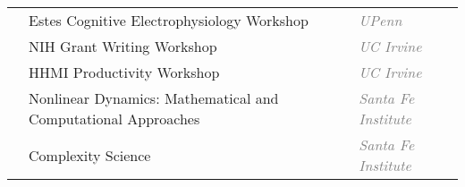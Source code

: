 \documentclass[11pt]{cooperCV_v1/cooperCV} %
\begin{document}



%


\selectfont


\begin{minipage}{\textwidth}







\begin{tabular}{ @{} p{} p{} p{} @{} }
  
  \small & {\small Estes Cognitive Electrophysiology Workshop} & \hfill {\small \textcolor{gray}{{\emph{UPenn}}}} \\
  
  \small & {\small NIH Grant Writing Workshop} & \hfill {\small \textcolor{gray}{{\emph{UC Irvine}}}} \\
  
  \small & {\small HHMI Productivity Workshop} & \hfill {\small \textcolor{gray}{{\emph{UC Irvine}}}} \\
  
  \small & {\small Nonlinear Dynamics: Mathematical and Computational Approaches} & \hfill {\small \textcolor{gray}{{\emph{Santa Fe Institute}}}} \\
  
  \small & {\small Complexity Science} & \hfill {\small \textcolor{gray}{{\emph{Santa Fe Institute}}}} \\
  

\end{tabular}
\end{minipage}
\end{document}
